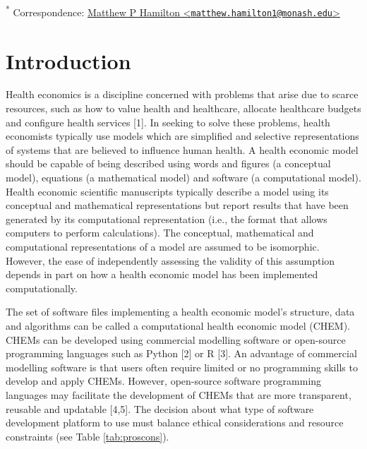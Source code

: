 \documentclass[
]{article}
\begin{document}
\textsuperscript{*} Correspondence: \href{mailto:matthew.hamilton1@monash.edu}{Matthew P Hamilton \textless{}\href{mailto:matthew.hamilton1@monash.edu}{\nolinkurl{matthew.hamilton1@monash.edu}}\textgreater{}}

\hypertarget{introduction}{%
\section{Introduction}\label{introduction}}

Health economics is a discipline concerned with problems that arise due to scarce resources, such as how to value health and healthcare, allocate healthcare budgets and configure health services {[}1{]}. In seeking to solve these problems, health economists typically use models which are simplified and selective representations of systems that are believed to influence human health. A health economic model should be capable of being described using words and figures (a conceptual model), equations (a mathematical model) and software (a computational model). Health economic scientific manuscripts typically describe a model using its conceptual and mathematical representations but report results that have been generated by its computational representation (i.e., the format that allows computers to perform calculations). The conceptual, mathematical and computational representations of a model are assumed to be isomorphic. However, the ease of independently assessing the validity of this assumption depends in part on how a health economic model has been implemented computationally.

The set of software files implementing a health economic model's structure, data and algorithms can be called a computational health economic model (CHEM). CHEMs can be developed using commercial modelling software or open-source programming languages such as Python {[}2{]} or R {[}3{]}. An advantage of commercial modelling software is that users often require limited or no programming skills to develop and apply CHEMs. However, open-source software programming languages may facilitate the development of CHEMs that are more transparent, reusable and updatable {[}4,5{]}. The decision about what type of software development platform to use must balance ethical considerations and resource constraints (see Table \ref{tab:proscons}).
\end{document}
